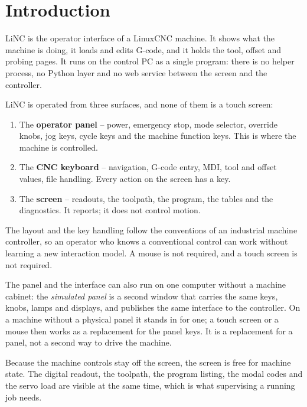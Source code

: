 \chapter{Introduction}
\label{ch:intro}

LiNC is the operator interface of a LinuxCNC machine. It shows what the machine is
doing, it loads and edits G-code, and it holds the tool, offset and probing pages.
It runs on the control PC as a single program: there is no helper process, no Python
layer and no web service between the screen and the controller.

LiNC is operated from three surfaces, and none of them is a touch screen:

\begin{enumerate}
  \item The \textbf{operator panel} -- power, emergency stop, mode selector, override
        knobs, jog keys, cycle keys and the machine function keys. This is where the
        machine is controlled.
  \item The \textbf{CNC keyboard} -- navigation, G-code entry, MDI, tool and offset
        values, file handling. Every action on the screen has a key.
  \item The \textbf{screen} -- readouts, the toolpath, the program, the tables and the
        diagnostics. It reports; it does not control motion.
\end{enumerate}

The layout and the key handling follow the conventions of an industrial machine
controller, so an operator who knows a conventional control can work without learning
a new interaction model. A mouse is not required, and a touch screen is not required.

The panel and the interface can also run on one computer without a machine cabinet: the
\emph{simulated panel} is a second window that carries the same keys, knobs, lamps and
displays, and publishes the same interface to the controller. On a machine without a
physical panel it stands in for one; a touch screen or a mouse then works as a
replacement for the panel keys. It is a replacement for a panel, not a second way to
drive the machine.

Because the machine controls stay off the screen, the screen is free for machine state.
The digital readout, the toolpath, the program listing, the modal codes and the servo
load are visible at the same time, which is what supervising a running job needs.


